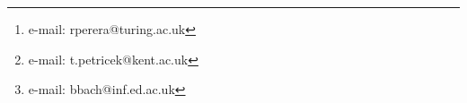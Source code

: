 

\author{Roly Perera\thanks{e-mail: rperera@turing.ac.uk}\\ %
        \scriptsize The Alan Turing Institute %
\and Tomas Petricek\thanks{e-mail: t.petricek@kent.ac.uk}\\ %
     \parbox{1.4in}{\scriptsize \centering University of Kent \\ The Alan Turing Institute} %
\and Benjamin Bach\thanks{e-mail: bbach@inf.ed.ac.uk}\\ %
     \scriptsize \centering University of Edinburgh}

